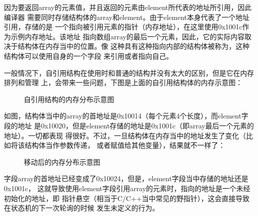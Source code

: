 因为要返回array的元素值，并且返回的元素由element所代表的地址所引用，因此编译器
需要同时存储结构体的array和element。由于element本身代表了一个地址引用，存储的是
一个指向被引用元素的指针（内存地址），在这里使用0x1001c作为示例内存地址。该地址
指向数组array的最后一个元素，因此，它的实际内容取决于结构体在内存当中的位置。像
这种具有这种指向内部的结构体被称为，这种结构体可以使用自身的一个字段
来引用或者指向自己。

一般情况下，自引用结构在使用时和普通的结构并没有太大的区别，但是它在内存排列和管理
上，会带来一些问题，下图是上面的自引用结构体的内存示意图：
\begin{figure}[H]
  \centering
  
  \caption{自引用结构的内存分布示意图\protect\footnotemark}
  \label{fig:self-referential-struct}
\end{figure}
如图，结构体当中的array的首地址是0x10014（每个元素4个长度），而element字段的地址
是0x10020，但是element存储的地址是0x1001c（即array最后一个元素的地址）。一切都表现
得很好。不过，一旦结构体在内存当中的地址发生了变化（比如将该结构体当作参数传递，
或者赋值给其他变量），结果就不一样了：
\begin{figure}[H]
  \centering
  
  \caption{移动后的内存分布示意图\protect\footnotemark}
  \label{fig:self-referential-struct-moved}
\end{figure}
字段array的首地址已经变成了0x10024，但是，element字段当中存储的地址还是0x1001c，
这就导致使用element字段引用array的元素时，指向的地址是一个未经初始化的地址，即
指针悬空（相当于C/C++当中常见的野指针），这会直接导致在状态机的下一次轮询的时候
发生未定义的行为。

